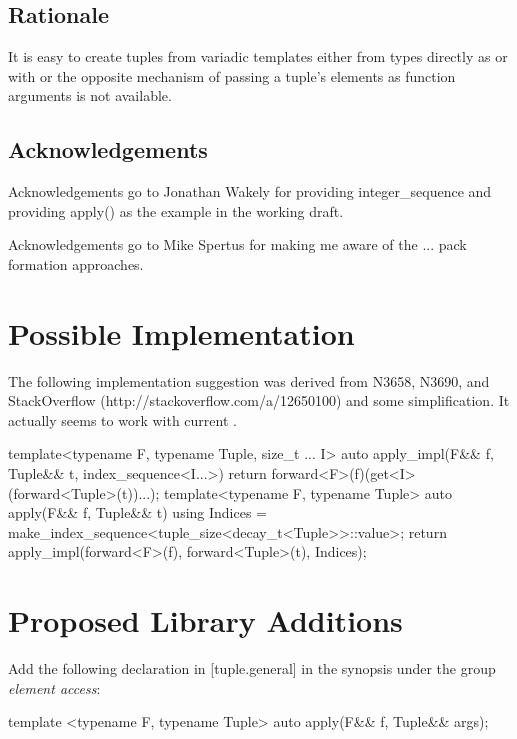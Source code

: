 \documentclass[ebook,11pt,article]{memoir}
\begin{document}
\section{Rationale}
It is easy to create tuples from variadic templates either from types directly as  or  with  or  the opposite mechanism of passing a tuple's elements as function arguments is not available.

\section{Acknowledgements}
Acknowledgements go to Jonathan Wakely for providing integer_sequence and providing apply() as the example in the working draft.

Acknowledgements go to Mike Spertus for making me aware of the ... pack formation approaches.

\chapter{Possible Implementation}
The following implementation suggestion was derived from N3658, N3690, and StackOverflow (http://stackoverflow.com/a/12650100) and some simplification. It actually seems to work with current .

\begin{codeblock}
template<typename F, typename Tuple, size_t ... I>
auto apply_impl(F&& f, Tuple&& t, index_sequence<I...>) {
	return forward<F>(f)(get<I>(forward<Tuple>(t))...);
}
template<typename F, typename Tuple>
auto apply(F&& f, Tuple&& t) {
  using Indices = make_index_sequence<tuple_size<decay_t<Tuple>>::value>;
  return apply_impl(forward<F>(f), forward<Tuple>(t), Indices{});
}
\end{codeblock}

\chapter{Proposed Library Additions}

Add the following declaration in [tuple.general] in the synopsis under the group \emph{element access}:

\begin{codeblock}
template <typename F, typename Tuple>
auto apply(F&& f, Tuple&& args);
\end{codeblock}
\end{document}
